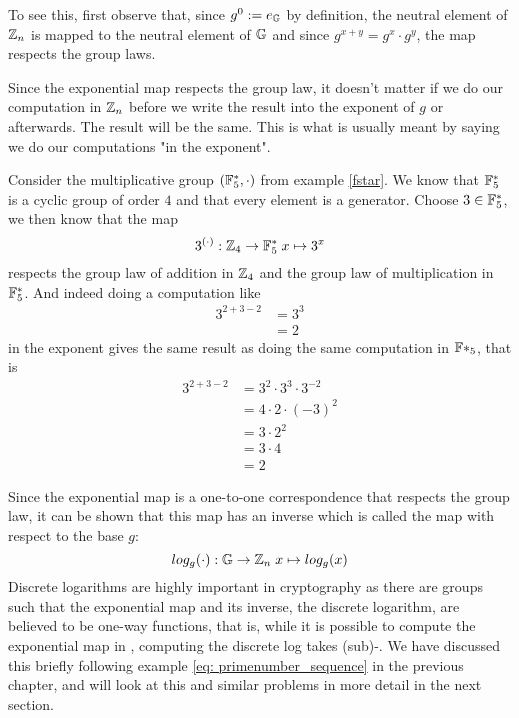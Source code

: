 To see this, first observe that, since $g^0:=e_{\mathbb{G}}$ by definition, the neutral element of $\mathbb{Z}_n$ is mapped to the neutral element of $\mathbb{G}$ and since $g^{x+y}=g^x\cdot g^y$, the map respects the group laws.

Since the exponential map respects the group law, it doesn't matter if we do our computation in $\mathbb{Z}_n$ before we write the result into the exponent of $g$ or afterwards. The result will be the same. This is what is usually meant by saying we do our computations "in the exponent".
\begin{example} Consider the multiplicative group $(\mathbb{F}_{5}^*,\cdot)$ from example \ref{fstar}. We know that $\mathbb{F}_{5}^*$ is a cyclic group of order $4$ and that every element is a generator. Choose $3\in\mathbb{F}_5^*$, we then know that the map
$$
3^{(\cdot)}: \mathbb{Z}_4 \to \mathbb{F}_5^* \; x \mapsto 3^x
$$
respects the group law of addition in $\mathbb{Z}_4$ and the group law of multiplication in $\mathbb{F}_5^*$.
And indeed doing a computation like
\begin{align*}
3^{2+3-2} &=3^{3}\\
          & = 2
\end{align*}
in the exponent gives the same result as doing the same computation in $\mathbb{F}*_5$, that is
\begin{align*}
3^{2+3-2} &= 3^2 \cdot 3^3 \cdot 3^{-2}\\
          &= 4\cdot 2 \cdot (-3)^2\\
          &= 3\cdot 2^2\\
          &= 3\cdot 4 \\
          &= 2
\end{align*}
\end{example}
Since the exponential map is a one-to-one correspondence that respects the group law, it can be shown that this map has an inverse which is called the  map with respect to the base $g$:
\begin{equation}
log_g(\cdot): \mathbb{G} \to \mathbb{Z}_n\; x \mapsto log_g(x)
\end{equation}
Discrete logarithms are highly important in cryptography as there are groups such that the exponential map and its inverse, the discrete logarithm, are believed to be one-way functions, that is, while it is possible to compute the exponential map in , computing the discrete log takes (sub)-. We have discussed this briefly following example \ref{eq: primenumber_sequence} in the previous chapter, and will look at this and similar problems in more detail in the next section.


